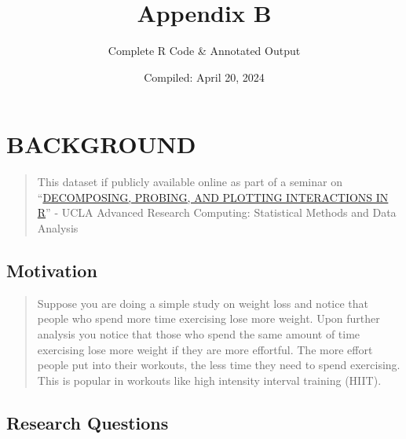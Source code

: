\documentclass[
]{article}
\title{Appendix B}
\subtitle{Complete R Code \& Annotated Output}
\author{}
\date{\vspace{-2.5em}Compiled: April 20, 2024}
\begin{document}
\maketitle

\setcounter{page}{100}
\pagestyle{plain}

\setcounter{figure}{0}
\setcounter{table}{0}
\renewcommand{\thefigure}{B.\arabic{figure}}
\renewcommand{\thetable}{B.\arabic{table}}

\clearpage
\setcounter{tocdepth}{2}
\tableofcontents    
\clearpage
\listoftables
\clearpage
\listoffigures
\clearpage

\hypertarget{background}{%
\section{BACKGROUND}\label{background}}

\begin{quote}
This dataset if publicly available online as part of a seminar on
``\href{https://stats.oarc.ucla.edu/r/seminars/interactions-r/}{DECOMPOSING,
PROBING, AND PLOTTING INTERACTIONS IN R}'' - UCLA Advanced Research
Computing: Statistical Methods and Data Analysis
\end{quote}

\hypertarget{motivation}{%
\subsection{Motivation}\label{motivation}}

\begin{quote}
Suppose you are doing a simple study on weight loss and notice that
people who spend more time exercising lose more weight. Upon further
analysis you notice that those who spend the same amount of time
exercising lose more weight if they are more effortful. The more effort
people put into their workouts, the less time they need to spend
exercising. This is popular in workouts like high intensity interval
training (HIIT).
\end{quote}

\hypertarget{research-questions}{%
\subsection{Research Questions}\label{research-questions}}
\end{document}
